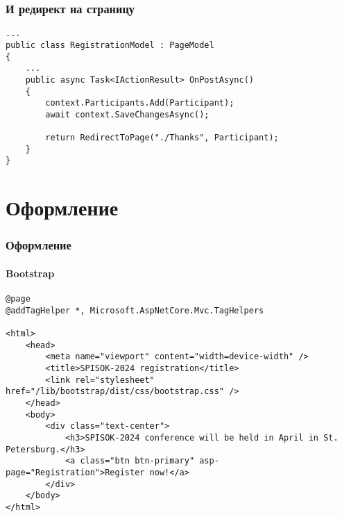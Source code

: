 \documentclass{../../slides-style}
\begin{document}
    \begin{frame}[fragile]
        \frametitle{И редирект на страницу}
        \begin{footnotesize}
            \begin{verbatim}
...
public class RegistrationModel : PageModel
{
    ...
    public async Task<IActionResult> OnPostAsync()
    {
        context.Participants.Add(Participant);
        await context.SaveChangesAsync();

        return RedirectToPage("./Thanks", Participant);
    }
}
            \end{verbatim}
        \end{footnotesize}
    \end{frame}

    \section{Оформление}

    \begin{frame}[fragile]
        \frametitle{Оформление}
        \framesubtitle{Bootstrap}
        \begin{scriptsize}
            \begin{verbatim}
@page
@addTagHelper *, Microsoft.AspNetCore.Mvc.TagHelpers

<html>
    <head>
        <meta name="viewport" content="width=device-width" />
        <title>SPISOK-2024 registration</title>
        <link rel="stylesheet" href="/lib/bootstrap/dist/css/bootstrap.css" />
    </head>
    <body>
        <div class="text-center">
            <h3>SPISOK-2024 conference will be held in April in St. Petersburg.</h3>
            <a class="btn btn-primary" asp-page="Registration">Register now!</a>
        </div>
    </body>
</html>
            \end{verbatim}
        \end{scriptsize}
    \end{frame}
\end{document}
